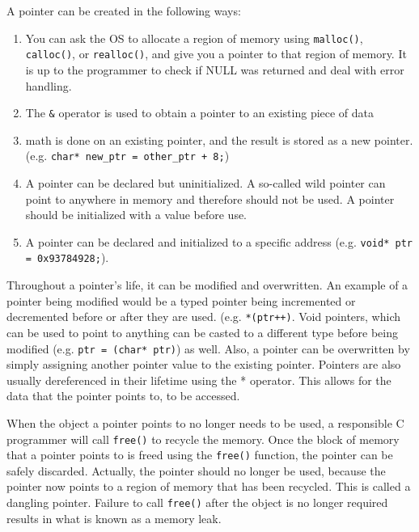 A pointer can be created in the following ways:
\begin{enumerate}
  \item You can ask the OS to allocate a region of
    memory using \texttt{malloc()}, \texttt{calloc()}, or \texttt{realloc()},
    and give you a pointer to that region of memory. It is up to the programmer
    to check if NULL was returned and deal with error handling.
  \item The \texttt{\&} operator is used to obtain a pointer to an existing
    piece of data
  \item math is done on an existing pointer, and the result is stored as a new
    pointer. (e.g. \texttt{char* new\_ptr = other\_ptr + 8;})
  \item A pointer can be declared but uninitialized. A so-called wild pointer
    can point to anywhere in memory and therefore should not be used. A pointer
    should be initialized with a value before use.
  \item A pointer can be declared and initialized to a specific address (e.g.
    \texttt{void* ptr = 0x93784928;}).
\end{enumerate}

Throughout a pointer's life, it can be modified and overwritten. An example of a
pointer being modified would be a typed pointer being incremented or decremented
before or after they are used. (e.g. \texttt{*(ptr++)}.  Void pointers, which
can be used to point to anything can be casted to a different type before being
modified (e.g. \texttt{ptr = (char* ptr)}) as well. Also, a pointer can be
overwritten by simply assigning another pointer value to the existing pointer.
Pointers are also usually dereferenced in their lifetime using the * operator.
This allows for the data that the pointer points to, to be accessed. 

When the object a pointer points to no longer needs to be used, a responsible C
programmer will call \texttt{free()} to recycle the memory.  Once the block of
memory that a pointer points to is freed using the \texttt{free()} function, the
pointer can be safely discarded. Actually, the pointer should no longer be used,
because the pointer now points to a region of memory that has been recycled.
This is called a dangling pointer. Failure to call \texttt{free()} after the
object is no longer required results in what is known as a memory leak.

